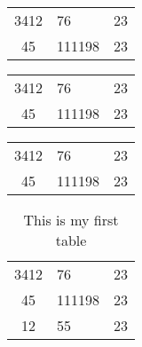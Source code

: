 \documentclass{book}
\begin{document}
\begin{tabular}{clr}
    3412 & 76 & 23\\
    45 & 111198 & 23\\
\end{tabular}

\begin{tabular}{c|l|r}
    3412 & 76 & 23\\
    45 & 111198 & 23\\
\end{tabular}

\begin{tabular}{c|l|r}
    \hline
    3412 & 76 & 23\\
    45 & 111198 & 23\\
    \hline
\end{tabular}












\begin{table}
    \centering

    \begin{tabular}{clr}
        \hline
        3412 & 76 & 23\\
        \cline{2-3}
        45 & 111198 & 23\\
        12 & 55 & 23\\
    \end{tabular}





    \caption{This is my first table}

\end{table}
\end{document}
